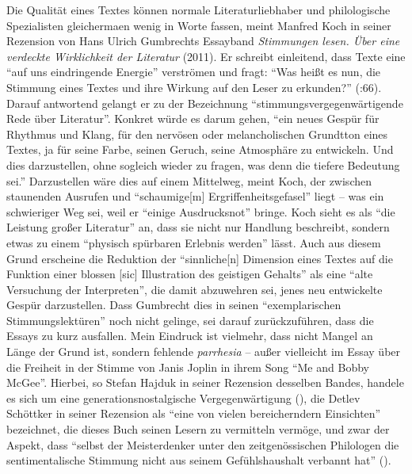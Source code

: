 \documentclass[fontsize=12pt]{scrartcl}
\begin{document}
Die Qualit\"at eines Textes k\"onnen normale Li\-te\-ra\-tur\-liebhaber\textsuperscript{\tiny *} und philologische Spezialisten\textsuperscript{\tiny *} glei\-cherma\-{\ss}en wenig in Worte fassen, meint Manfred Koch in sei\-ner Rezension von Hans Ulrich Gumbrechts Essayband \textit{Stimmungen lesen. \"Uber eine verdeckte Wirk\-lich\-keit der Li\-te\-ra\-tur} (2011). Er schreibt einlei\-tend, dass Texte eine "`auf uns eindringende Energie"' verstr\"omen und fragt: "`Was hei{\ss}t es nun, die Stimmung eines Textes und ihre Wirkung auf den Leser zu erkunden?"' (\cite{Koch2011}:66). Darauf antwortend gelangt er zu der Be\-zeichnung "`stimmungsvergegenw\"artigende Rede \"uber Li\-te\-ra\-tur"'. Konkret w\"urde es darum gehen, "`ein neues Gesp\"ur f\"ur Rhythmus und Klang, f\"ur den nerv\"osen oder melancholischen Grundtton eines Textes, ja f\"ur seine Farbe, seinen Geruch, seine Atmosph\"are zu entwickeln. Und dies darzustellen, ohne so\-gleich wieder zu fragen, was denn die tiefere Bedeutung sei."' Darzustellen w\"are dies auf einem Mittelweg, meint Koch, der zwischen staunenden Ausrufen und "`schau\-mi\-ge[m] Ergriffenheitsgefasel"' liegt -- was ein schwieriger Weg sei, weil er "`einige Ausdrucksnot"' bringe. Koch sieht es als "`die Leistung gro{\ss}er Li\-te\-ra\-tur"' an, dass sie nicht nur Handlung beschreibt, sondern etwas zu einem "`physisch sp\"urbaren Erlebnis werden"' l\"asst. Auch aus diesem Grund erscheine die Reduktion der "`sinnliche[n] Dimension eines Textes auf die Funktion einer blossen [sic] Illustration des geistigen Gehalts"' als eine "`alte Versuchung der Interpreten"', die damit abzuwehren sei, jenes neu ent\-wickelte Gesp\"ur darzustellen. Dass Gumbrecht dies in seinen "`exemplarischen Stimmungslekt\"uren"' noch nicht gelinge, sei darauf zur\"uckzuf\"uhren, dass die Essays zu kurz ausfallen. Mein Eindruck ist vielmehr, dass nicht Mangel an L\"ange der Grund ist, sondern fehlende \textit{parrhesia} -- au{\ss}er vielleicht im Essay \"uber die Freiheit in der Stimme von Janis Joplin in ihrem Song "`Me and Bobby McGee"'. Hierbei, so Stefan Hajduk in seiner Rezension desselben Bandes, handele es sich um eine generationsnostalgische Vergegenw\"artigung (\cite{Hajduk2012}), die Detlev Sch\"ottker in sei\-ner Rezension als "`eine von vielen bereicherndern Einsichten"' be\-zeichnet, die dieses Buch seinen Lesern zu vermitteln verm\"oge, und zwar der Aspekt, dass "`\mbox{selbst} der Meisterdenker unter den zeitgen\"ossischen Philologen die sentimentalische Stimmung nicht aus seinem Ge\-f\"uhlshaushalt verbannt hat"' (\cite{Schottker2011}).
\end{document}
